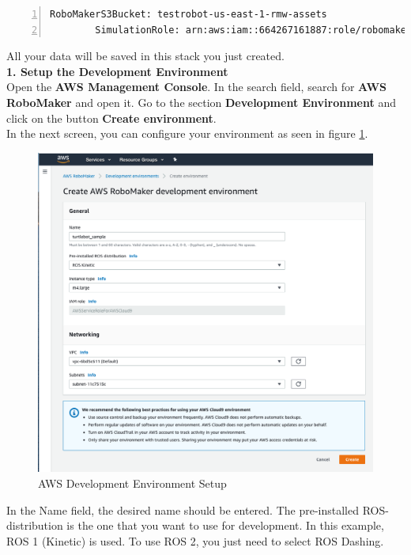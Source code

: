 \documentclass[plainarticle,zihtitle,english,final,hyperref,utf8]{zihpub}
\begin{document}
\begin{Verbatim}[breaklines=true, breakanywhere=true, baselinestretch=1,fontsize=\scriptsize,numbers=left,frame=single,stepnumber=5,xleftmargin=1cm,xrightmargin=1cm]
        RoboMakerS3Bucket: testrobot-us-east-1-rmw-assets
        SimulationRole: arn:aws:iam::664267161887:role/robomaker-simulation-role-us-east-1
    \end{Verbatim}

All your data will be saved in this stack you just created.\\ 
\newline
\textbf{1. Setup the Development Environment}\\
\newline
Open the \textbf{AWS Management Console}. In the search field, search for \textbf{AWS RoboMaker} and open it. Go to the section \textbf{Development Environment} and click on the button \textbf{Create environment}. \\
\newline 
In the next screen, you can configure your environment as seen in figure \ref{fig:devEnvAWS}.
\begin{figure}[h!]
  \begin{center}
    \includegraphics[width=.75\textwidth]{development_environment.png}
    \caption{AWS Development Environment Setup}
    \label{fig:devEnvAWS}
  \end{center}
\end{figure}
In the Name field, the desired name should be entered. The pre-installed ROS-distribution is the one that you want to use for development. In this example, ROS 1 (Kinetic) is used. To use ROS 2, you just need to select ROS Dashing.\\
\end{document}
